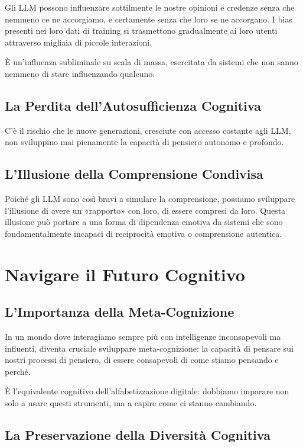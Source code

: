 Gli LLM possono influenzare sottilmente le nostre opinioni e credenze senza che nemmeno ce ne accorgiamo, e certamente senza che loro se ne accorgano. I bias presenti nei loro dati di training si trasmettono gradualmente ai loro utenti attraverso migliaia di piccole interazioni.

È un'influenza subliminale su scala di massa, esercitata da sistemi che non sanno nemmeno di stare influenzando qualcuno.

\subsection{La Perdita dell'Autosufficienza Cognitiva}

C'è il rischio che le nuove generazioni, cresciute con accesso costante agli LLM, non sviluppino mai pienamente la capacità di pensiero autonomo e profondo.

\subsection{L'Illusione della Comprensione Condivisa}

Poiché gli LLM sono così bravi a simulare la comprensione, possiamo sviluppare l'illusione di avere un «rapporto» con loro, di essere compresi da loro. Questa illusione può portare a una forma di dipendenza emotiva da sistemi che sono fondamentalmente incapaci di reciprocità emotiva o comprensione autentica.

\section{Navigare il Futuro Cognitivo}

\subsection{L'Importanza della Meta-Cognizione}

In un mondo dove interagiamo sempre più con intelligenze inconsapevoli ma influenti, diventa cruciale sviluppare meta-cognizione: la capacità di pensare sui nostri processi di pensiero, di essere consapevoli di come stiamo pensando e perché.

È l'equivalente cognitivo dell'alfabetizzazione digitale: dobbiamo imparare non solo a usare questi strumenti, ma a capire come ci stanno cambiando.

\subsection{La Preservazione della Diversità Cognitiva}

